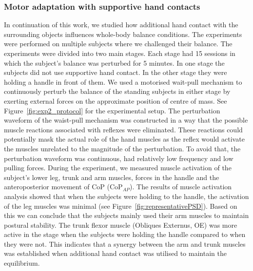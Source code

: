 \documentclass[final,5p,twocolumn]{elsarticle}
\begin{document}
\subsubsection{Motor adaptation with supportive hand contacts}
In continuation of this work, we studied how additional hand contact with the surrounding objects influences whole-body balance conditions. The experiments were performed on multiple subjects where we challenged their balance. The experiments were divided into two main stages. Each stage had 15 sessions in which the subject's balance was perturbed for 5 minutes. In one stage the subjects did not use supportive hand contact. In the other stage they were holding a handle in front of them. We used a motorised wait-pull mechanism \cite{Peternel2013} to continuously perturb the balance of the standing subjects in either stage by exerting external forces on the approximate position of centre of mass. See Figure~\ref{fig:exp2_protocol} for the experimental setup. The perturbation waveform of the waist-pull mechanism was constructed in a way that the possible muscle reactions associated with reflexes were eliminated. These reactions could potentially mask the actual role of the hand muscles as the reflex would activate the muscles unrelated to the magnitude of the perturbation. To avoid that, the perturbation waveform was continuous, had relatively low frequency and low pulling forces. During the experiment, we measured muscle activation of the subject's lower leg, trunk and arm muscles, forces in the handle and the anteroposterior movement of CoP (CoP$_{AP}$). The results of muscle activation analysis showed that when the subjects were holding to the handle, the activation of the leg muscles was minimal (see Figure~\ref{fig:representativePSD}). Based on this we can conclude that the subjects mainly used their arm muscles to maintain postural stability. The trunk flexor muscle (Obliques Externus, OE) was more active in the stage when the subjects were holding the handle compared to when they were not. This indicates that a synergy between the arm and trunk muscles was established when additional hand contact was utilised to maintain the equilibrium.
\end{document}
